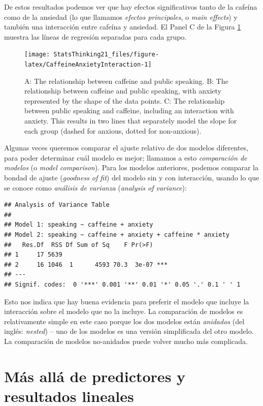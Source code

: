 \documentclass[
  12pt,
]{book}
\begin{document}
De estos resultados podemos ver que hay efectos significativos tanto de la cafeína como de la ansiedad (lo que llamamos \emph{efectos principales}, o \emph{main effects}) y también una interacción entre cafeína y ansiedad. El Panel C de la Figura \ref{fig:CaffeineAnxietyInteraction} muestra las líneas de regresión separadas para cada grupo.

\begin{figure}
\texttt{[image: StatsThinking21\_files/figure-latex/CaffeineAnxietyInteraction-1]} \caption{A: The relationship between caffeine and public speaking. B: The relationship between caffeine and public speaking, with anxiety represented by the shape of the data points. C: The relationship between public speaking and caffeine, including an interaction with anxiety.  This results in two lines that separately model the slope for each group (dashed for anxious, dotted for non-anxious).}\label{fig:CaffeineAnxietyInteraction}
\end{figure}

Algunas veces queremos comparar el ajuste relativo de dos modelos diferentes, para poder determinar cuál modelo es mejor; llamamos a esto \emph{comparación de modelos} (o \emph{model comparison}). Para los modelos anteriores, podemos comparar la bondad de ajuste (\emph{goodness of fit}) del modelo sin y con interacción, usando lo que se conoce como \emph{análisis de varianza} (\emph{analysis of variance}):

\begin{verbatim}
## Analysis of Variance Table
## 
## Model 1: speaking ~ caffeine + anxiety
## Model 2: speaking ~ caffeine + anxiety + caffeine * anxiety
##   Res.Df  RSS Df Sum of Sq    F Pr(>F)    
## 1     17 5639                             
## 2     16 1046  1      4593 70.3  3e-07 ***
## ---
## Signif. codes:  0 '***' 0.001 '**' 0.01 '*' 0.05 '.' 0.1 ' ' 1
\end{verbatim}

Esto nos indica que hay buena evidencia para preferir el modelo que incluye la interacción sobre el modelo que no la incluye. La comparación de modelos es relativamente simple en este caso porque los dos modelos están \emph{anidados} (del inglés: \emph{nested}) -- uno de los modelos es una versión simplificada del otro modelo. La comparación de modelos no-anidados puede volver mucho más complicada.

\hypertarget{muxe1s-alluxe1-de-predictores-y-resultados-lineales}{%
\section{Más allá de predictores y resultados lineales}\label{muxe1s-alluxe1-de-predictores-y-resultados-lineales}}
\end{document}
